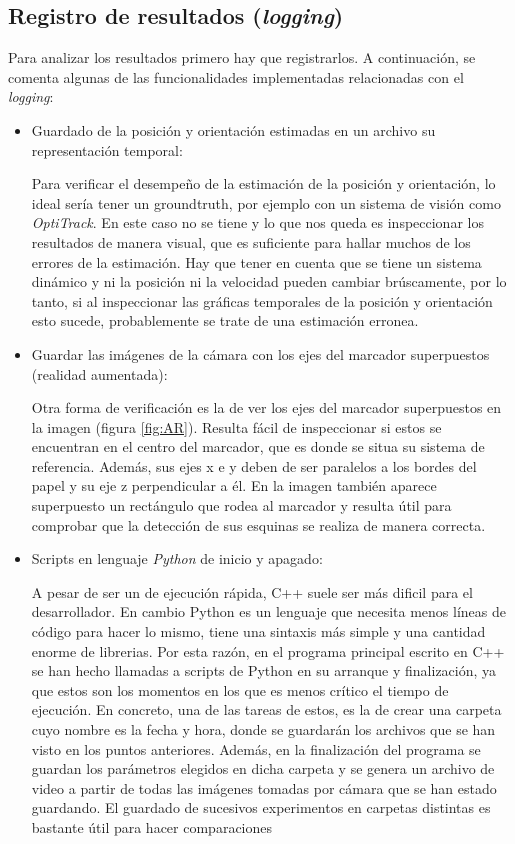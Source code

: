 \subsection{Registro de resultados (\textit{logging})}
Para analizar los resultados primero hay que registrarlos.
A continuación, se comenta algunas de las funcionalidades implementadas relacionadas con el \textit{logging}: 
\begin{itemize}
\item Guardado de la posición y orientación estimadas en un archivo su representación temporal: 

	Para verificar el desempeño de la estimación de la posición y orientación, lo ideal sería tener un groundtruth, por ejemplo con un sistema de visión como \textit{OptiTrack}. En este caso no se tiene y lo que nos queda es inspeccionar los resultados de manera visual, que es suficiente para hallar muchos de los errores de la estimación. Hay que tener en cuenta que se tiene un sistema dinámico y ni la posición ni la velocidad pueden cambiar brúscamente, por lo tanto, si al inspeccionar las gráficas temporales de la posición y orientación esto sucede, probablemente se trate de una estimación erronea. 

\item Guardar las imágenes de la cámara con los ejes del marcador superpuestos (realidad aumentada):

	Otra forma de verificación es la de ver los ejes del marcador superpuestos en la imagen (figura \ref{fig:AR}). Resulta fácil de inspeccionar si estos se encuentran en el centro del marcador, que es donde se situa su sistema de referencia. Además, sus ejes x e y deben de ser paralelos a los bordes del papel y su eje z perpendicular a él. En la imagen también aparece superpuesto un rectángulo que rodea al marcador y resulta útil para comprobar que la detección de sus esquinas se realiza de manera correcta.  
	\figAR

\item Scripts en lenguaje \textit{Python} de inicio y apagado:

	A pesar de ser un de ejecución rápida, C++ suele ser más dificil para el desarrollador. En cambio Python es un lenguaje que necesita menos líneas de código para hacer lo mismo, tiene una sintaxis más simple y una cantidad enorme de librerias. 
	Por esta razón, en el programa principal escrito en C++ se han hecho llamadas a scripts de Python en su arranque y finalización, ya que estos son los momentos en los que es menos crítico el tiempo de ejecución. 
	En concreto, una de las tareas de estos, es la de crear una carpeta cuyo nombre es la fecha y hora, donde se guardarán los archivos que se han visto en los puntos anteriores. Además, en la finalización del programa se guardan los parámetros elegidos en dicha carpeta y se genera un archivo de video a partir de todas las imágenes tomadas por cámara que se han estado guardando.
	El guardado de sucesivos experimentos en carpetas distintas es bastante útil para hacer comparaciones
\end{itemize}

